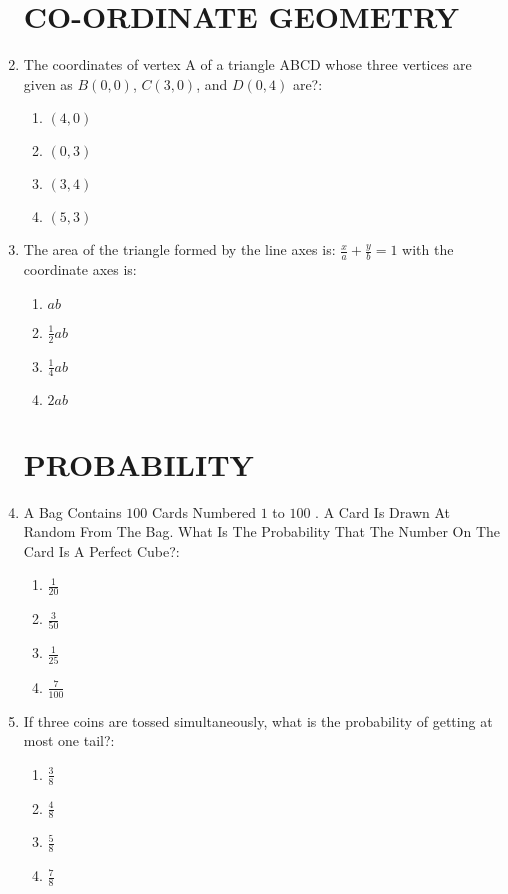 \documentclass[12pt-letter paper]{article}
\providecommand{\brak}[1]{\ensuremath{\left(#1\right)}}
\begin{document}
\begin{enumerate}
\begin{center}
\section*{CO-ORDINATE GEOMETRY}        
\end{center}
\item  The coordinates of vertex A of a triangle ABCD whose three vertices are given as $B\brak{0,0}$, $C\brak{3,0}$, and $D\brak{0,4}$ are?:  
\begin{enumerate}
\item $  \brak{4,0} $                      
\item $  \brak{0,3} $                          
\item $  \brak{3,4} $                                  
\item $  \brak{5,3} $
\end{enumerate}
\item The area of the triangle formed by the line axes is: $\frac{x}{a} +\frac{y}{b} = 1$ with the coordinate axes is:  
\begin{enumerate}
\item $ ab $                                    
\item $ \frac{1}{2}ab $        
\item $ \frac{1}{4}ab $              
\item $ 2ab $
\end{enumerate}                                  
\begin{center}                                    
\section*{PROBABILITY}        
\end{center}
\item A Bag Contains $100$ Cards Numbered $1$ to $100$ . A Card Is Drawn At Random From The Bag. What Is The Probability That The Number On The Card Is A Perfect Cube?:    
\begin{enumerate}
\item $ \frac{1}{20} $              
\item $ \frac{3}{50} $                    
\item $ \frac{1}{25} $                                                
\item $ \frac{7}{100} $
\end{enumerate}
\newpage
\item If three coins are tossed simultaneously, what is the probability of getting at most one tail?:
\begin{enumerate}
\item $ \frac{3}{8} $                              
\item $ \frac{4}{8} $                            
\item $ \frac{5}{8} $  
\item $ \frac{7}{8} $    
\end{enumerate}                                  
\begin{center}                                    

\end{center}
\end{enumerate}
\end{document}
